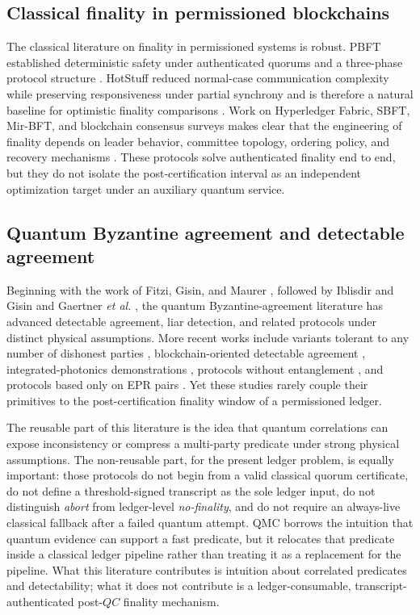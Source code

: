 \documentclass{ieeeaccess}
\begin{document}
\subsection{Classical finality in permissioned blockchains}
The classical literature on finality in permissioned systems is robust. PBFT established deterministic safety under authenticated quorums and a three-phase protocol structure \cite{b2}. HotStuff reduced normal-case communication complexity while preserving responsiveness under partial synchrony and is therefore a natural baseline for optimistic finality comparisons \cite{b5}. Work on Hyperledger Fabric, SBFT, Mir-BFT, and blockchain consensus surveys makes clear that the engineering of finality depends on leader behavior, committee topology, ordering policy, and recovery mechanisms \cite{b4,b6,b13,b14,b15,b16}. These protocols solve authenticated finality end to end, but they do not isolate the post-certification interval as an independent optimization target under an auxiliary quantum service.

\subsection{Quantum Byzantine agreement and detectable agreement}
Beginning with the work of Fitzi, Gisin, and Maurer \cite{b7}, followed by Iblisdir and Gisin \cite{b8} and Gaertner \textit{et al.} \cite{b9}, the quantum Byzantine-agreement literature has advanced detectable agreement, liar detection, and related protocols under distinct physical assumptions. More recent works include variants tolerant to any number of dishonest parties \cite{b10}, blockchain-oriented detectable agreement \cite{b11}, integrated-photonics demonstrations \cite{b12}, protocols without entanglement \cite{b17}, and protocols based only on EPR pairs \cite{b18}. Yet these studies rarely couple their primitives to the post-certification finality window of a permissioned ledger.

The reusable part of this literature is the idea that quantum correlations can expose inconsistency or compress a multi-party predicate under strong physical assumptions. The non-reusable part, for the present ledger problem, is equally important: those protocols do not begin from a valid classical quorum certificate, do not define a threshold-signed transcript as the sole ledger input, do not distinguish \textit{abort} from ledger-level \textit{no-finality}, and do not require an always-live classical fallback after a failed quantum attempt. QMC borrows the intuition that quantum evidence can support a fast predicate, but it relocates that predicate inside a classical ledger pipeline rather than treating it as a replacement for the pipeline. What this literature contributes is intuition about correlated predicates and detectability; what it does not contribute is a ledger-consumable, transcript-authenticated post-$QC$ finality mechanism.
\end{document}
